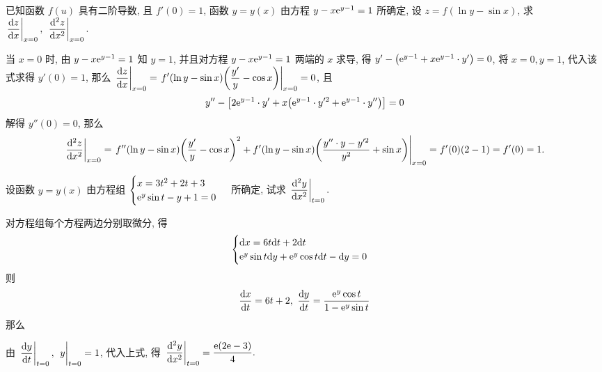 \begin{example}[2007 数二]
    已知函数 $f(u)$ 具有二阶导数, 且 $f'(0)=1$, 函数 $y=y(x)$ 由方程 $y-x\mathrm{e} ^{y-1}=1$ 所确定, 设 $z=f(\ln y-\sin x)$, 求 $\displaystyle \eval{\dv{z}{x}}_{x=0},~\eval{\dv[2]{z}{x}}_{x=0}.$
\end{example}
\begin{solution}
    当 $x=0$ 时, 由 $y-x\mathrm{e} ^{y-1}=1$ 知 $y=1$, 并且对方程 $y-x\mathrm{e} ^{y-1}=1$ 两端的 $x$ 求导, 得 $y'-\qty(\mathrm{e} ^{y-1}+x\mathrm{e} ^{y-1}\cdot y')=0$, 将 $x=0,y=1$, 代入该式求得 $y'(0)=1$, 那么
    $\displaystyle \eval{\dv{z}{x}}_{x=0}=\eval{f'(\ln y-\sin x)\qty(\dfrac{y'}{y}-\cos x)}_{x=0}=0$, 且 $$y''-\qty[2\mathrm{e} ^{y-1}\cdot y'+x\qty(\mathrm{e} ^{y-1}\cdot y'^2+\mathrm{e} ^{y-1}\cdot y'')]=0$$
    解得 $y''(0)=0$, 那么
    $$\eval{\dv[2]{z}{x}}_{x=0}=\eval{f''(\ln y-\sin x)\qty(\dfrac{y'}{y}-\cos x)^2+f'(\ln y-\sin x)\qty(\dfrac{y''\cdot y-y'^2}{y^2}+\sin x)}_{x=0}=f'(0)(2-1)=f'(0)=1.$$
\end{solution}

\begin{example}
    设函数 $y=y(x)$ 由方程组 $\begin{cases}
            x=3t^2+2t+3 \\ \mathrm{e}^y\sin t-y+1=0
        \end{cases}$ 所确定, 试求 $\displaystyle\eval{\dv[2]{y}{x}}_{t=0}.$
\end{example}
\begin{solution}
    对方程组每个方程两边分别取微分, 得 $$\begin{cases}
            \dd x=6t\dd t+2\dd t \\ \mathrm{e}^y\sin t\dd y+\mathrm{e}^y\cos t\dd t-\dd y=0
        \end{cases}$$ 则 $$\displaystyle\dv{x}{t}=6t+2,~\dv{y}{t}=\dfrac{\mathrm{e}^y\cos t}{1-\mathrm{e}^y\sin t}$$ 那么
    由 $\displaystyle\eval{\dv{y}{t}}_{t=0},~\eval{y}_{t=0}=1$, 代入上式, 得 $\displaystyle\eval{\dv[2]{y}{x}}_{t=0}=\dfrac{\e(2\e-3)}{4}.$
\end{solution}


